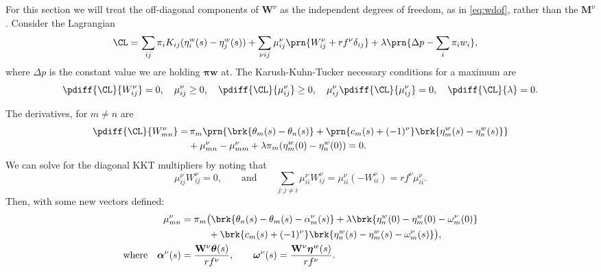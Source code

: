\documentclass[12pt]{article}
\newcommand{\eqm}{\pi}
\newcommand{\eq}{\boldsymbol{\eqm}}
\newcommand{\etwm}{\eta^w}
\newcommand{\etw}{\boldsymbol{\eta}^w}
\newcommand{\thbm}{\theta}
\newcommand{\thb}{\boldsymbol{\thbm}}
\newcommand{\ombm}{\omega}
\newcommand{\omb}{\boldsymbol{\ombm}}
\newcommand{\albm}{\alpha}
\newcommand{\alb}{\boldsymbol{\albm}}
\newcommand{\wm}{w}
\newcommand{\w}{\mathbf{\wm}}
\newcommand{\Wm}{W}
\newcommand{\W}{\mathbf{\Wm}}
\newcommand{\MMdm}{M}
\newcommand{\MMd}{\mathbf{\MMdm}}
\newcommand{\encm}{K}
\newcommand{\kktm}{\mu}
\begin{document}
For this section we will treat the off-diagonal components of \(\W^\nu\) as the independent degrees of freedom, as in \cref{eq:wdof}, rather than the \(\MMd^\nu\).
Consider the Lagrangian
%
\begin{equation}\label{eq:finitelagrangian}
\begin{aligned}
  \CL =&\, \sum_{ij} \eqm_i \encm_{ij} (\etwm_i(s) - \etwm_j(s))
        +\sum_{\nu i j} \kktm^\nu_{ij} \prn{ \Wm^\nu_{ij} + r f^\nu \delta_{ij} }
        + \lambda \prn{ \Delta p - \sum_i \eqm_i \wm_i },
\end{aligned}
\end{equation}
%
where \(\Delta p\) is the constant value we are holding \(\eq\w\) at.
The Karush-Kuhn-Tucker necessary conditions for a maximum are
%
\begin{equation}\label{eq:KTfinite}
  \pdiff{\CL}{\Wm^\nu_{ij}} = 0, \quad
  \kktm^\nu_{ij} \geq 0, \quad
  \pdiff{\CL}{\kktm^\nu_{ij}} \geq 0, \quad
  \kktm^\nu_{ij}\pdiff{\CL}{\kktm^\nu_{ij}} = 0, \quad
  \pdiff{\CL}{\lambda} = 0.
\end{equation}
%

The derivatives, for \(m \neq n\) are
%
\begin{equation}\label{eq:finitederivs}
\begin{aligned}
  \pdiff{\CL}{\Wm^\nu_{mn}} = & \,
    \eqm_m \prn{ \brk{\thbm_m(s) - \thbm_n(s)}
     + \prn{c_m(s) + (-1)^\nu} \brk{\etwm_m(s) - \etwm_n(s)} } \\
     &+ \kktm^\nu_{mn} -  \kktm^\nu_{mm}
     + \lambda \eqm_m (\etwm_{m}(0)-\etwm_{n}(0)) 
    = 0.
\end{aligned}
\end{equation}
%
We can solve for the diagonal KKT multipliers by noting that
%
\begin{equation*}
  \kktm^\nu_{ij} \Wm^\nu_{ij} = 0,
  \qquad \text{and} \qquad
  \sum_{j: j \neq i} \kktm^\nu_{ii} \Wm^\nu_{ij} 
      = \kktm^\nu_{ii} ( - \Wm^\nu_{ii}) = r f^\nu \kktm^\nu_{ii}.
\end{equation*}
%
Then, with some new vectors defined:
%
\begin{equation}\label{eq:kktsol}
\begin{aligned}
  \kktm^\nu_{mn} &= \eqm_m \big( 
      \brk{ \thbm_n(s) - \thbm_m(s) - \albm^\nu_m(s) }
    + \lambda \brk{ \etwm_n(0) - \etwm_m(0) - \ombm^\nu_m(0) } 
  \\ &\hphantom{= \eqm_m \big( }
    + \brk{{c}_m(s) + (-1)^\nu} 
        \brk{ \etwm_n(s) - \etwm_m(s) - \ombm^\nu_m(s) }
     \big), \\
  \text{where} \quad 
  \alb^\nu(s) &= \frac{\W^\nu \thb(s)}{rf^\nu}, \qquad
  \omb^\nu(s) = \frac{\W^\nu \etw(s)}{rf^\nu}.
\end{aligned}
\end{equation}
%
\end{document}
